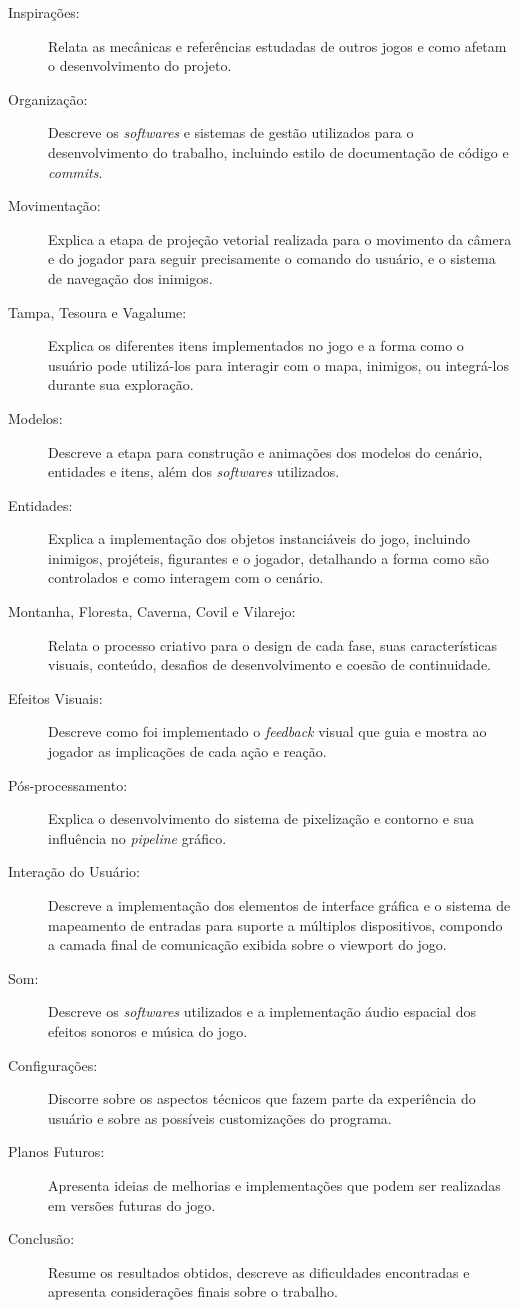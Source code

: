 \begin{description}
	\item[Inspirações:] Relata as mecânicas e referências estudadas de outros jogos e como afetam o
	desenvolvimento do projeto.
	\item[Organização:] Descreve os \textit{softwares} e sistemas de gestão utilizados para o desenvolvimento
	do trabalho, incluindo estilo de documentação de código e \textit{commits}.
	\item[Movimentação:] Explica a etapa de projeção vetorial realizada para o movimento da câmera e do
	jogador para seguir precisamente o comando do usuário, e o sistema de navegação dos inimigos.
	\item[Tampa, Tesoura e Vagalume:] Explica os diferentes itens implementados no jogo e a forma como
	o usuário pode utilizá-los para interagir com o mapa, inimigos, ou integrá-los durante sua exploração.
	\item[Modelos:] Descreve a etapa para construção e animações dos modelos do cenário, entidades e
	itens, além dos \textit{softwares} utilizados.
	\item[Entidades:] Explica a implementação dos objetos instanciáveis do jogo, incluindo inimigos,
	projéteis, figurantes e o jogador, detalhando a forma como são controlados e como interagem com
	o cenário.
	\item[Montanha, Floresta, Caverna, Covil e Vilarejo:] Relata o processo criativo para o design de
	cada fase, suas características visuais, conteúdo, desafios de desenvolvimento e coesão de continuidade.
	\item[Efeitos Visuais:] Descreve como foi implementado o \textit{feedback} visual que guia e mostra
	ao jogador as implicações de cada ação e reação.
	\item[Pós-processamento:] Explica o desenvolvimento do sistema de pixelização e contorno e sua
	influência no \textit{pipeline} gráfico.
	\item[Interação do Usuário:] Descreve a implementação dos elementos de interface gráfica e o sistema
	de mapeamento de entradas para suporte a múltiplos dispositivos, compondo a camada final de comunicação
	exibida sobre o viewport do jogo.
	\item[Som:] Descreve os \textit{softwares} utilizados e a implementação áudio espacial dos efeitos
	sonoros e música do jogo.
	\item[Configurações:] Discorre sobre os aspectos técnicos que fazem parte da experiência do usuário e
	sobre as possíveis customizações do programa.
	\item[Planos Futuros:] Apresenta ideias de melhorias e implementações que podem ser realizadas em
	versões futuras do jogo.
	\item[Conclusão:] Resume os resultados obtidos, descreve as dificuldades encontradas e apresenta
	considerações finais sobre o trabalho.
\end{description}

